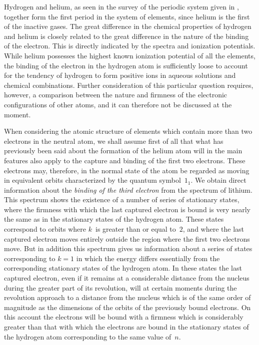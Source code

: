Hydrogen and helium, as seen in the survey of the periodic
system given in , together form the first period in the system
of elements, since helium is the first of the inactive gases. The great
difference in the chemical properties of hydrogen and helium is
closely related to the great difference in the nature of the binding
of the electron. This is directly indicated by the spectra and
ionization potentials. While helium possesses the highest known
ionization potential of all the elements, the binding of the electron
in the hydrogen atom is sufficiently loose to account for the tendency
of hydrogen to form positive ions in aqueous solutions and chemical
combinations. Further consideration of this particular question
requires, however, a comparison between the nature and firmness
of the electronic configurations of other atoms, and it can therefore
not be discussed at the moment.

 When considering the atomic
structure of elements which contain more than two electrons in the
neutral atom, we shall assume first of all that what has previously
been said about the formation of the helium atom will in the main
features also apply to the capture and binding of the first two
electrons. These electrons may, therefore, in the normal state of
the atom be regarded as moving in equivalent orbits characterized
by the quantum symbol~$1_{1}$. We obtain direct information about
the \emph{binding of the third electron} from the spectrum of lithium.
This spectrum shows the existence of a number of series of
stationary states, where the firmness with which the last captured
electron is bound is very nearly the same as in the stationary states
of the hydrogen atom. These states correspond to orbits where $k$~is
greater than or equal to~$2$, and where the last captured electron
moves entirely outside the region where the first two electrons
move. But in addition this spectrum gives us information about a
series of states corresponding to $k = 1$ in which the energy differs
essentially from the corresponding stationary states of the hydrogen
atom. In these states the last captured electron, even if it remains
at a considerable distance from the nucleus during the greater part
of its revolution, will at certain moments during the revolution
approach to a distance from the nucleus which is of the same order
of magnitude as the dimensions of the orbits of the previously
bound electrons. On this account the electrons will be bound with
a firmness which is considerably greater than that with which the
electrons are bound in the stationary states of the hydrogen atom
corresponding to the same value of~$n$.

